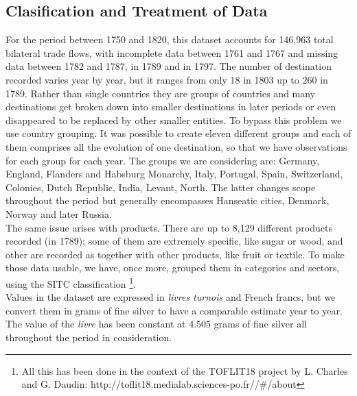 \documentclass[12pt,a4paper,notitlepage,english]{article}
\begin{document}
\subsection{Clasification and Treatment of Data} \label{figures}
For the period between 1750 and 1820, this dataset accounts for 146,963 total bilateral trade flows, with incomplete data between 1761 and 1767 and missing data between 1782 and 1787, in 1789 and in 1797. The number of destination recorded varies year by year, but it ranges from only 18 in 1803 up to 260 in 1789. Rather than single countries they are groups of countries and many destinations get broken down into smaller destinations in later periods or even disappeared to be replaced by other smaller entities. To bypass this problem we use country grouping. It was possible to create eleven different groups and each of them comprises all the evolution of one destination, so that we have observations for each group for each year. The groups we are considering are: Germany, England, Flanders and Habsburg Monarchy, Italy, Portugal, Spain, Switzerland, Colonies, Dutch Republic, India, Levant, North. The latter changes scope throughout the period but generally encompasses Hanseatic cities, Denmark, Norway and later Russia. \\
The same issue arises with products. There are up to 8,129 different  products recorded (in 1789); some of them are extremely specific, like sugar or wood, and other are recorded as together with other products, like fruit or textile. To make those data usable, we have, once more, grouped them in categories and sectors, using the SITC classification \footnote{All this has been done in the context of the TOFLIT18 project by  L. Charles and G. Daudin: http://toflit18.medialab.sciences-po.fr//\#/about}.  \\
Values in the dataset are expressed in \textit{livres turnois} and French francs, but we convert them in grams of fine silver to have a comparable estimate year to year. The value of the \textit{livre} has been constant at 4.505 grams of fine silver all throughout the period in consideration.
\end{document}
